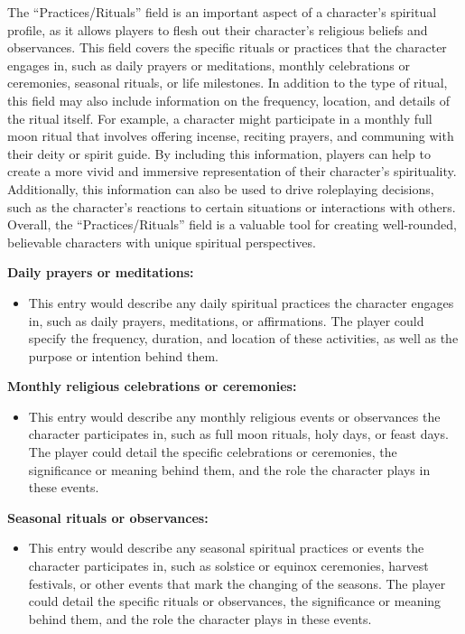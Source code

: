 The ``Practices/Rituals'' field is an important aspect of a character's
spiritual profile, as it allows players to flesh out their character's
religious beliefs and observances. This field covers the specific
rituals or practices that the character engages in, such as daily
prayers or meditations, monthly celebrations or ceremonies, seasonal
rituals, or life milestones. In addition to the type of ritual, this
field may also include information on the frequency, location, and
details of the ritual itself. For example, a character might participate
in a monthly full moon ritual that involves offering incense, reciting
prayers, and communing with their deity or spirit guide. By including
this information, players can help to create a more vivid and immersive
representation of their character's spirituality. Additionally, this
information can also be used to drive roleplaying decisions, such as the
character's reactions to certain situations or interactions with others.
Overall, the ``Practices/Rituals'' field is a valuable tool for creating
well-rounded, believable characters with unique spiritual perspectives.

\textbf{Daily prayers or meditations:}

\begin{itemize}
\tightlist
\item
  This entry would describe any daily spiritual practices the character
  engages in, such as daily prayers, meditations, or affirmations. The
  player could specify the frequency, duration, and location of these
  activities, as well as the purpose or intention behind them.
\end{itemize}

\textbf{Monthly religious celebrations or ceremonies:}

\begin{itemize}
\tightlist
\item
  This entry would describe any monthly religious events or observances
  the character participates in, such as full moon rituals, holy days,
  or feast days. The player could detail the specific celebrations or
  ceremonies, the significance or meaning behind them, and the role the
  character plays in these events.
\end{itemize}

\textbf{Seasonal rituals or observances:}

\begin{itemize}
\tightlist
\item
  This entry would describe any seasonal spiritual practices or events
  the character participates in, such as solstice or equinox ceremonies,
  harvest festivals, or other events that mark the changing of the
  seasons. The player could detail the specific rituals or observances,
  the significance or meaning behind them, and the role the character
  plays in these events.
\end{itemize}

